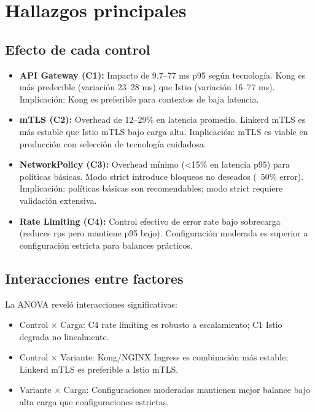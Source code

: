 \section{Hallazgos principales}

\subsection{Efecto de cada control}

\begin{itemize}
	\item \textbf{API Gateway (C1):} Impacto de 9.7--77 ms p95 según tecnología. Kong es más predecible (variación 23--28 ms) que Istio (variación 16--77 ms). Implicación: Kong es preferible para contextos de baja latencia.
	
	\item \textbf{mTLS (C2):} Overhead de 12--29\% en latencia promedio. Linkerd mTLS es más estable que Istio mTLS bajo carga alta. Implicación: mTLS es viable en producción con selección de tecnología cuidadosa.
	
	\item \textbf{NetworkPolicy (C3):} Overhead mínimo (<15\% en latencia p95) para políticas básicas. Modo strict introduce bloqueos no deseados (~50\% error). Implicación: políticas básicas son recomendables; modo strict requiere validación extensiva.
	
	\item \textbf{Rate Limiting (C4):} Control efectivo de error rate bajo sobrecarga (reduces rps pero mantiene p95 bajo). Configuración moderada es superior a configuración estricta para balances prácticos.
\end{itemize}

\subsection{Interacciones entre factores}

La ANOVA reveló interacciones significativas:
\begin{itemize}
	\item Control × Carga: C4 rate limiting es robusto a escalamiento; C1 Istio degrada no linealmente.
	\item Control × Variante: Kong/NGINX Ingress es combinación más estable; Linkerd mTLS es preferible a Istio mTLS.
	\item Variante × Carga: Configuraciones moderadas mantienen mejor balance bajo alta carga que configuraciones estrictas.
\end{itemize}

